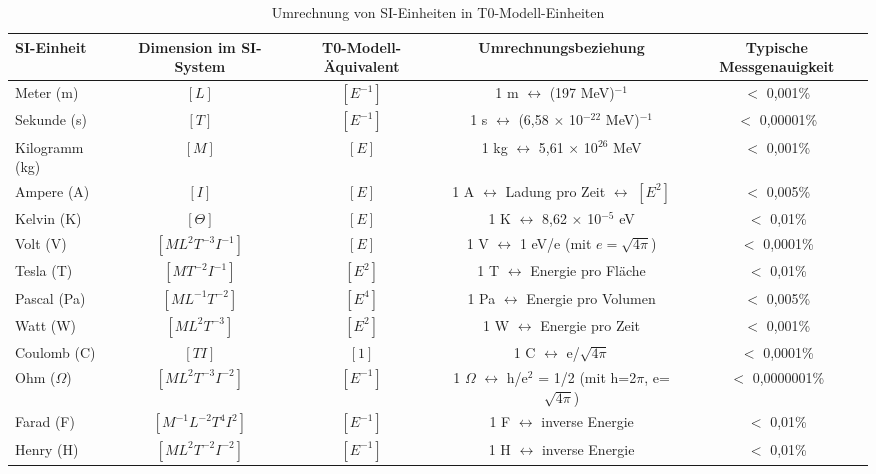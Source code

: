 \documentclass[12pt,a4paper]{article}
\begin{document}
\begin{table}[H]
	\centering
	\begin{adjustbox}{width=\textwidth}
		\begin{tabular}{lcccc}
			\toprule
			\textbf{SI-Einheit} & \textbf{Dimension im SI-System} & \textbf{T0-Modell-Äquivalent} & \textbf{Umrechnungsbeziehung} & \textbf{Typische Messgenauigkeit} \\
			\midrule
			Meter (m) & $[L]$ & $[E^{-1}]$ & 1 m $\leftrightarrow$ (197 MeV)$^{-1}$ & $<$ 0,001\% \\
			Sekunde (s) & $[T]$ & $[E^{-1}]$ & 1 s $\leftrightarrow$ (6,58 $\times$ 10$^{-22}$ MeV)$^{-1}$ & $<$ 0,00001\% \\
			Kilogramm (kg) & $[M]$ & $[E]$ & 1 kg $\leftrightarrow$ 5,61 $\times$ 10$^{26}$ MeV & $<$ 0,001\% \\
			Ampere (A) & $[I]$ & $[E]$ & 1 A $\leftrightarrow$ Ladung pro Zeit $\leftrightarrow$ $[E^2]$ & $<$ 0,005\% \\
			Kelvin (K) & $[\Theta]$ & $[E]$ & 1 K $\leftrightarrow$ 8,62 $\times$ 10$^{-5}$ eV & $<$ 0,01\% \\
			Volt (V) & $[ML^2T^{-3}I^{-1}]$ & $[E]$ & 1 V $\leftrightarrow$ 1 eV/e (mit $e = \sqrt{4\pi}$) & $<$ 0,0001\% \\
			Tesla (T) & $[MT^{-2}I^{-1}]$ & $[E^2]$ & 1 T $\leftrightarrow$ Energie pro Fläche & $<$ 0,01\% \\
			Pascal (Pa) & $[ML^{-1}T^{-2}]$ & $[E^4]$ & 1 Pa $\leftrightarrow$ Energie pro Volumen & $<$ 0,005\% \\
			Watt (W) & $[ML^2T^{-3}]$ & $[E^2]$ & 1 W $\leftrightarrow$ Energie pro Zeit & $<$ 0,001\% \\
			Coulomb (C) & $[TI]$ & $[1]$ & 1 C $\leftrightarrow$ e/$\sqrt{4\pi}$ & $<$ 0,0001\% \\
			Ohm ($\Omega$) & $[ML^2T^{-3}I^{-2}]$ & $[E^{-1}]$ & 1 $\Omega$ $\leftrightarrow$ h/e$^2$ = 1/2 (mit h=2$\pi$, e=$\sqrt{4\pi}$) & $<$ 0,0000001\% \\
			Farad (F) & $[M^{-1}L^{-2}T^4I^2]$ & $[E^{-1}]$ & 1 F $\leftrightarrow$ inverse Energie & $<$ 0,01\% \\
			Henry (H) & $[ML^2T^{-2}I^{-2}]$ & $[E^{-1}]$ & 1 H $\leftrightarrow$ inverse Energie & $<$ 0,01\% \\
			\bottomrule
		\end{tabular}
	\end{adjustbox}
	\caption{Umrechnung von SI-Einheiten in T0-Modell-Einheiten}
	\label{tab:conversion}
\end{table}
\end{document}
